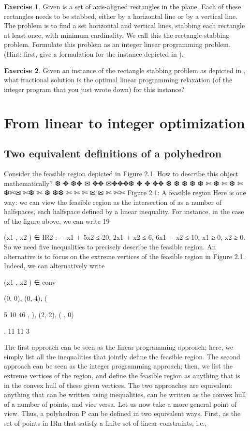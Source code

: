 \documentclass[titlepage]{book}
\theoremstyle{definition}
\newtheorem{exercise}{Exercise}
\begin{document}
\begin{exercise}
Given is a set of axis-aligned rectangles in the plane. Each of these rectangles needs to be stabbed, either by a horizontal line or by a vertical line. The problem is to find a set horizontal and vertical lines, stabbing each rectangle at least once, with minimum cardinality. We call this the rectangle stabbing problem. Formulate this problem as an integer linear programming problem. (Hint: first, give a formulation for the instance depicted in ).
\end{exercise}
\begin{exercise}
Given an instance of the rectangle stabbing problem as depicted in , what fractional solution is the optimal linear programming relaxation (of the integer program that you just wrote down) for this instance?
\end{exercise}


\chapter{From linear to integer optimization}

\section{Two equivalent definitions of a polyhedron}

Consider the feasible region depicted in Figure 2.1. How to describe this object mathematically?
❆
✥
❆✥
✉ ✥✥
✉✥✥✥❆
✥
✥
✥✥
❆
❆
❆
❆
❆
✄
❆ ✄
❆ ✄
❆✄✉
✄❆
✄ ❆
❆❆
✄
✄
✄
✉
✉
✄
✄✄
Figure 2.1: A feasible region
Here is one way: we can view the feasible region as the intersection of as a number of halfspaces, each
halfspace defined by a linear inequality. For instance, in the case of the figure above, we can write
19

{(x1 , x2 ) ∈ IR2 : − x1 + 5x2 ≤ 20, 2x1 + x2 ≤ 6, 6x1 − x2 ≤ 10, x1 ≥ 0, x2 ≥ 0}.
So we need five inequalities to precisely describe the feasible region.
An alternative is to focus on the extreme vertices of the feasible region in Figure 2.1. Indeed, we can
alternatively write

{(x1 , x2 ) ∈ conv{(0, 0), (0, 4), (

5
10 46
, ), (2, 2), ( , 0)} }.
11 11
3

The first approach can be seen as the linear programming approach; here, we simply list all the inequalities
that jointly define the feasible region. The second approach can be seen as the integer programming
approach; then, we list the extreme vertices of the region, and define the feasible region as anything that
is in the convex hull of these given vertices. The two approaches are equivalent: anything that can be
written using inequalities, can be written as the convex hull of a number of points, and vice versa.
Let us now take a more general point of view. Thus, a polyhedron P can be defined in two equivalent
ways. First, as the set of points in IRn that satisfy a finite set of linear constraints, i.e.,
\end{document}
